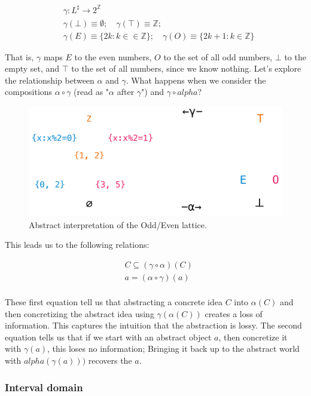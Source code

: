 \documentclass[11pt]{book}
\newcommand{\Z}{\ensuremath{\mathbb Z}}
\begin{document}
\begin{align*}
&\gamma: L^\sharp \rightarrow 2^\Z \\
&\gamma(\bot) \equiv \emptyset; \quad \gamma(\top) \equiv \Z; \\
&\gamma(E) \equiv \{ 2 k : k \in \in \Z\}; \quad
\gamma(O) \equiv \{ 2k + 1: k \in \Z \}
\end{align*}

That is, $\gamma$ maps $E$ to the even numbers, $O$ to the set of all odd
numbers, $\bot$ to the empty set, and $\top$ to the set of all numbers, since
we know nothing. Let's explore the relationship between $\alpha$ and $\gamma$.
What happens  when we consider the compositions $\alpha \circ \gamma$ (read as
"$\alpha$ after $\gamma$") and $\gamma \circ alpha$?

\begin{figure}[htb]
\includegraphics[width=\textwidth]{./abstract-interpretation.pdf}
\caption{Abstract interpretation of the Odd/Even lattice.}
\end{figure}

This leads us to the following relations:

\begin{align*}
	&C \subseteq (\gamma\circ \alpha)(C) \\
	&a = (\alpha \circ \gamma)(a) \\
\end{align*}

These first equation tell us that abstracting a concrete idea $C$ into
$\alpha(C)$ and then concretizing the abstract idea using $\gamma(\alpha(C))$
creates a loss of information. This captures the intuition that the abstraction
is lossy. The second equation tells us that if we start with an abstract object
$a$, then concretize it with $\gamma(a)$, this loses no information; Bringing
it back up to the abstract world with $alpha(\gamma(a)))$ recovers the $a$.
\subsubsection{Interval domain}
\end{document}
